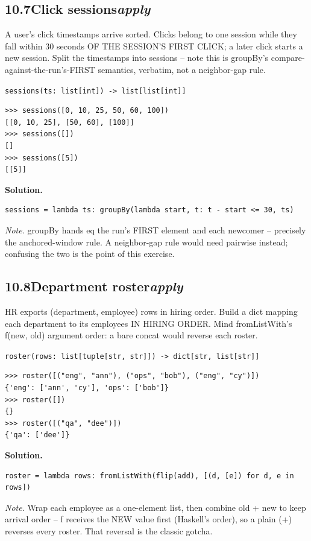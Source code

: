 \documentclass[10pt,letterpaper]{book}
\begin{document}
\subsection*{10.7\quad Click sessions\hfill\textnormal{\textit{apply}}}
A user's click timestamps arrive sorted. Clicks belong to one session while they fall within 30 seconds OF THE SESSION'S FIRST CLICK; a later click starts a new session. Split the timestamps into sessions -- note this is groupBy's compare-against-the-run's-FIRST semantics, verbatim, not a neighbor-gap rule.

\noindent\texttt{sessions(ts: list[int]) -> list[list[int]]}
\begin{lstlisting}[style=ex]
>>> sessions([0, 10, 25, 50, 60, 100])
[[0, 10, 25], [50, 60], [100]]
>>> sessions([])
[]
>>> sessions([5])
[[5]]
\end{lstlisting}
\noindent\textbf{Solution.}
\begin{lstlisting}[style=code]
sessions = lambda ts: groupBy(lambda start, t: t - start <= 30, ts)
\end{lstlisting}
\noindent\textit{Note.} groupBy hands eq the run's FIRST element and each newcomer -- precisely the anchored-window rule. A neighbor-gap rule would need pairwise instead; confusing the two is the point of this exercise.

\subsection*{10.8\quad Department roster\hfill\textnormal{\textit{apply}}}
HR exports (department, employee) rows in hiring order. Build a dict mapping each department to its employees IN HIRING ORDER. Mind fromListWith's f(new, old) argument order: a bare concat would reverse each roster.

\noindent\texttt{roster(rows: list[tuple[str, str]]) -> dict[str, list[str]]}
\begin{lstlisting}[style=ex]
>>> roster([("eng", "ann"), ("ops", "bob"), ("eng", "cy")])
{'eng': ['ann', 'cy'], 'ops': ['bob']}
>>> roster([])
{}
>>> roster([("qa", "dee")])
{'qa': ['dee']}
\end{lstlisting}
\noindent\textbf{Solution.}
\begin{lstlisting}[style=code]
roster = lambda rows: fromListWith(flip(add), [(d, [e]) for d, e in rows])
\end{lstlisting}
\noindent\textit{Note.} Wrap each employee as a one-element list, then combine old + new to keep arrival order -- f receives the NEW value first (Haskell's order), so a plain (+) reverses every roster. That reversal is the classic gotcha.
\end{document}
